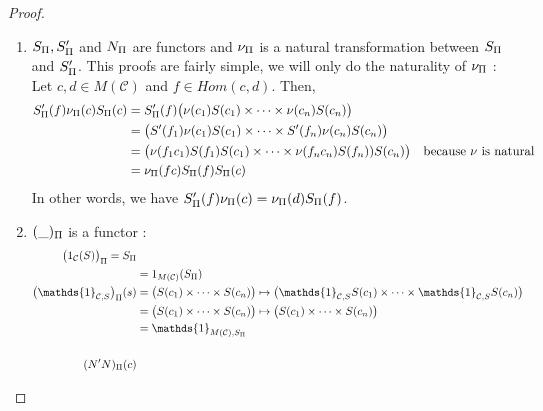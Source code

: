 \begin{proof}
    \begin{enumerate}
        \item $S_\Pi, S'_\Pi$ and $N_\Pi$ are functors and $\nu_\Pi$ is a natural transformation between $S_\Pi$ and $S'_\Pi$. This proofs are fairly simple, we will only do the naturality of $\nu_\Pi$ : \newline
              Let $c,d \in M(\mathcal{C})$ and $ f\in Hom(c,d)$. Then,
              \begin{align*}
                  S'_\Pi(f) \nu_\Pi(c) S_\Pi(c)
                   & = S'_\Pi(f) \big( \nu(c_1) S(c_1)\times\dots\times \nu(c_n) S(c_n)\big)     &                                 \\
                   & =  \big( S'(f_1)\nu(c_1) S(c_1)\times\dots\times S'(f_n)\nu(c_n) S(c_n)\big)     &                                 \\
                   & =  \big( \nu(f_1c_1)S(f_1)S(c_1)\times\dots\times \nu(f_nc_n)S(f_n)) S(c_n)\big) & \text{because $\nu$ is natural} \\
                   & = \nu_\Pi(fc)S_\Pi(f)S_\Pi(c)                                     &
              \end{align*}
              In other words, we have $ S'_\Pi(f) \nu_\Pi(c) = \nu_\Pi(d)S_\Pi(f)$.
        \item $(\_)_\Pi$ is a functor :
              \begin{align*}
                  \big(1_{\mathcal{C}}(S)\big)_\prodmon = S_\prodmon       \\
                   & =  1_{M(\mathcal{C})}(S_\prodmon)                     \\
                  \big(\mathds{1}_{\mathcal{C},S}\big)_\prodmon(s)
                   & = \big(S(c_1)\times\dots\times S(c_n)\big)
                  \mapsto \big(\mathds{1}_{\mathcal{C},S} S(c_1)
                  \times\dots\times \mathds{1}_{\mathcal{C},S} S(c_n)\big) \\
                   & = \big(S(c_1)\times\dots\times S(c_n)\big)
                  \mapsto  \big(S(c_1)\times\dots\times S(c_n)\big)        \\
                   & = \mathds{1}_{M(\mathcal{C}),S_\prodmon}              \\
                   &                                                       \\
                  (N'N)_\prodmon(c)

\end{align*}
\end{enumerate}
\end{proof}
